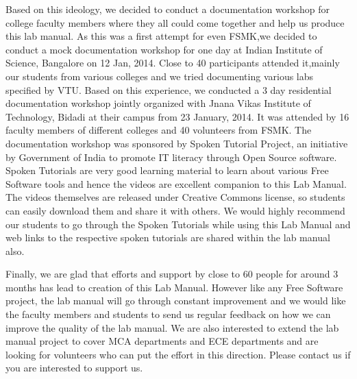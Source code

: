 Based on this ideology, we decided to conduct a documentation workshop
for college faculty members where they all could come together and help
us produce this lab manual. As this was a first attempt for even FSMK,we
decided to conduct a mock documentation workshop for one day at Indian
Institute of Science, Bangalore on 12 Jan, 2014. Close to 40
participants attended it,mainly our students from various colleges and
we tried documenting various labs specified by VTU. Based on this
experience, we conducted a 3 day residential documentation workshop
jointly organized with Jnana Vikas Institute of Technology, Bidadi at
their campus from 23 January, 2014. It was attended by 16 faculty
members of different colleges and 40 volunteers from FSMK. The
documentation workshop was sponsored by Spoken Tutorial Project, an
initiative by Government of India to promote IT literacy through Open
Source software. Spoken Tutorials are very good learning material to
learn about various Free Software tools and hence the videos are
excellent companion to this Lab Manual. The videos themselves are
released under Creative Commons license, so students can easily download
them and share it with others. We would highly recommend our students to
go through the Spoken Tutorials while using this Lab Manual and web
links to the respective spoken tutorials are shared within the lab
manual also.

Finally, we are glad that efforts and support by close to 60 people for
around 3 months has lead to creation of this Lab Manual. However like
any Free Software project, the lab manual will go through constant
improvement and we would like the faculty members and students to send
us regular feedback on how we can improve the quality of the lab manual.
We are also interested to extend the lab manual project to cover MCA
departments and ECE departments and are looking for volunteers who can
put the effort in this direction. Please contact us if you are
interested to support us.
